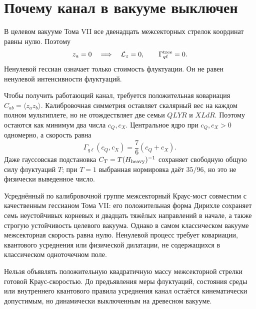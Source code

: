 \section{Почему канал в вакууме выключен}

В целевом вакууме Тома VII все двенадцать межсекторных стрелок координат равны
нулю. Поэтому
\begin{equation}
 z_a=0\quad\Longrightarrow\quad
 \mathcal L_z=0,
 \qquad
 \Gamma_{q\ell}^{\rm tree}=0.
 \label{eq:v8-tree-kraus-rate-zero}
\end{equation}
Ненулевой гессиан означает только стоимость флуктуации. Он не равен
ненулевой интенсивности флуктуаций.

Чтобы получить работающий канал, требуется положительная ковариация
$C_{ab}=\langle z_az_b\rangle$. Калибровочная симметрия оставляет скалярный вес на
каждом полном мультиплете, но не отождествляет две семьи $QLYR$ и $XLdR$.
Поэтому остаются как минимум два числа $c_Q,c_X$. Центральное ядро при
$c_Q,c_X>0$ одномерно, а скорость равна
\begin{equation}
 \Gamma_{q\ell}(c_Q,c_X)=\frac76(c_Q+c_X).
 \label{eq:v8-kraus-rate-covariance-scale}
\end{equation}
Даже гауссовская подстановка
$C_T=T(H_{\rm heavy})^{-1}$ сохраняет свободную общую силу флуктуаций
$T$; при $T=1$ выбранная нормировка даёт $35/96$, но это не физически
выведенное число.

\begin{theorem}
Усреднённый по калибровочной группе межсекторный Краус-мост совместим с качественным
гессианом Тома VII: его положительная форма Дирихле сохраняет семь
неустойчивых корневых и двадцать тяжёлых направлений в начале, а также
строгую устойчивость целевого вакуума. Однако в самом классическом вакууме
межсекторная скорость равна нулю. Ненулевой процесс требует ковариации,
квантового усреднения или физической дилатации, не содержащихся в
классическом одноточечном поле.
\end{theorem}

\begin{nogocriterion}
Нельзя объявлять положительную квадратичную массу межсекторной стрелки
готовой Краус-скоростью. До предъявления меры флуктуаций, состояния среды
или внутреннего квантового правила усреднения канал остаётся кинематически
допустимым, но динамически выключенным на древесном вакууме.
\end{nogocriterion}

